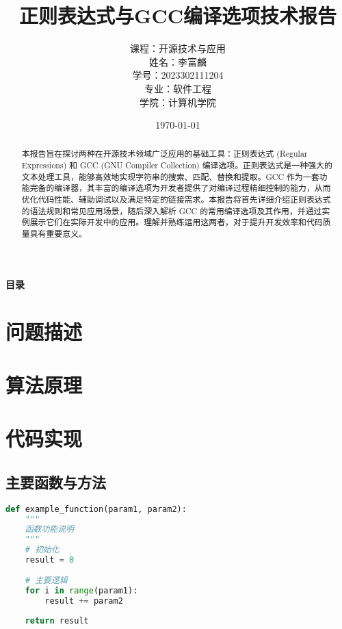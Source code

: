 \documentclass[letterpaper,12pt]{article}
\title{
    \textbf{正则表达式与GCC编译选项技术报告}
}
\author{
    \Large{课程：开源技术与应用} \\[0.5cm]
    \Large{姓名：李富麟} \\[0.3cm]
    \Large{学号：2023302111204} \\[0.3cm]
    \Large{专业：软件工程} \\[0.3cm]
    \Large{学院：计算机学院}
}
\date{\vspace{2cm}\today}
\begin{document}
\begin{titlepage}
\maketitle
\thispagestyle{empty}
\end{titlepage}

\newpage
\setcounter{page}{1}

\begin{abstract}
本报告旨在探讨两种在开源技术领域广泛应用的基础工具：正则表达式 (Regular Expressions) 和 GCC (GNU Compiler Collection) 编译选项。正则表达式是一种强大的文本处理工具，能够高效地实现字符串的搜索、匹配、替换和提取。GCC 作为一套功能完备的编译器，其丰富的编译选项为开发者提供了对编译过程精细控制的能力，从而优化代码性能、辅助调试以及满足特定的链接需求。本报告将首先详细介绍正则表达式的语法规则和常见应用场景，随后深入解析 GCC 的常用编译选项及其作用，并通过实例展示它们在实际开发中的应用。理解并熟练运用这两者，对于提升开发效率和代码质量具有重要意义。
\end{abstract}
\newpage

\begingroup
\centering
\Large\bfseries 目录
\par
\endgroup
\vspace{1cm}
\renewcommand{\contentsname}{}
\tableofcontents
\newpage

\section{问题描述}

\section{算法原理}

\section{代码实现}

\subsection{主要函数与方法}
\begin{lstlisting}[language=Python, caption=示例代码]
def example_function(param1, param2):
    """
    函数功能说明
    """
    # 初始化
    result = 0
    
    # 主要逻辑
    for i in range(param1):
        result += param2
        
    return result
\end{lstlisting}
\end{document}
